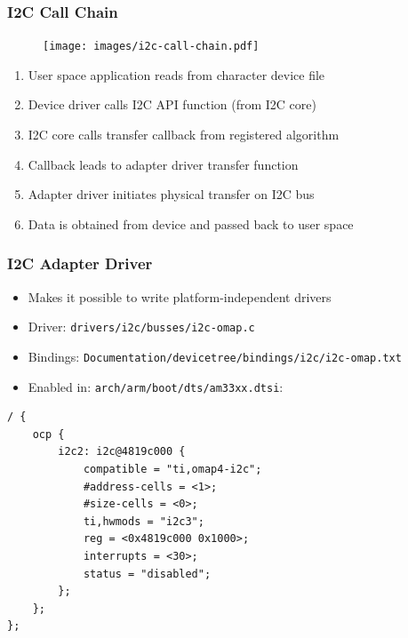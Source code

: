\begin{frame}
  \frametitle{I2C Call Chain}
  \begin{figure}
    \centering
    \texttt{[image: images/i2c-call-chain.pdf]}
  \end{figure}
  \begin{enumerate}
    \item User space application reads from character device file
    \item Device driver calls I2C API function (from I2C core)
    \item I2C core calls transfer callback from registered algorithm
    \item Callback leads to adapter driver transfer function
    \item Adapter driver initiates physical transfer on I2C bus
    \item Data is obtained from device and passed back to user space
  \end{enumerate}
  \vspace*{-7mm}
\end{frame}

\begin{frame}[containsverbatim]
  \frametitle{I2C Adapter Driver}
  \begin{itemize}
    \item Makes it possible to write \alert{platform-independent} drivers
    \item Driver: \texttt{drivers/i2c/busses/i2c-omap.c}
    \item Bindings: \texttt{Documentation/devicetree/bindings/i2c/i2c-omap.txt}
    \item Enabled in: \texttt{arch/arm/boot/dts/am33xx.dtsi}:
  \end{itemize}
  \begin{lstlisting}
/ {
	ocp {
		i2c2: i2c@4819c000 {
			compatible = "ti,omap4-i2c";
			#address-cells = <1>;
			#size-cells = <0>;
			ti,hwmods = "i2c3";
			reg = <0x4819c000 0x1000>;
			interrupts = <30>;
			status = "disabled";
		};
	};
};
  \end{lstlisting}
  \vspace*{-12mm}
\end{frame}

